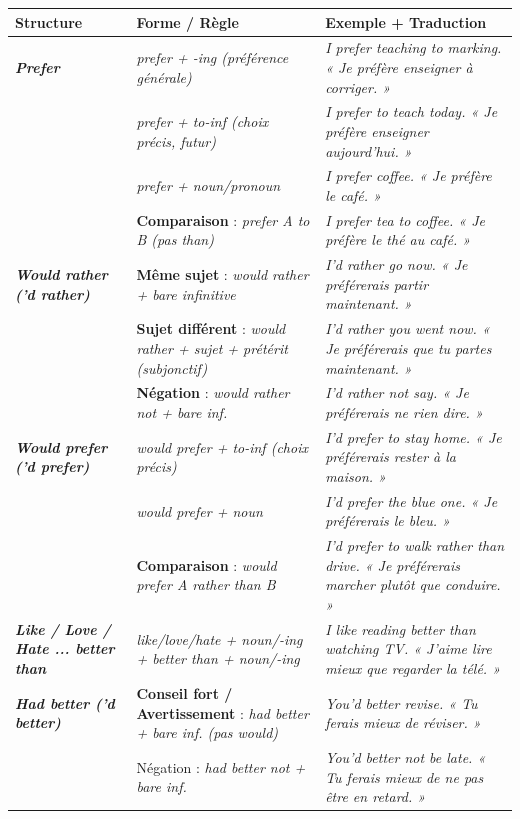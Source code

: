 \documentclass[11pt]{article}
\newcommand{\eng}[1]{\ifmmode\text{\textit{#1}}\else\begingroup\selectlanguage{english}\itshape #1\endgroup\fi}
\begin{document}
\begin{center}
\begin{tabularx}{\linewidth}{|>{\bfseries}l|X|X|}
\hline
\rowcolor{popblueL} \textbf{Structure} & \textbf{Forme / Règle} & \textbf{Exemple + Traduction} \\
\hline
\eng{Prefer} & \eng{prefer + -ing} (préférence générale) & \eng{I prefer teaching to marking.} « Je préfère enseigner à corriger. » \\
& \eng{prefer + to-inf} (choix précis, futur) & \eng{I prefer to teach today.} « Je préfère enseigner aujourd'hui. » \\
& \eng{prefer + noun/pronoun} & \eng{I prefer coffee.} « Je préfère le café. » \\
& \textbf{Comparaison} : \eng{prefer A to B} (pas \eng{than}) & \eng{I prefer tea to coffee.} « Je préfère le thé au café. » \\
\hline
\eng{Would rather} (\eng{'d rather}) & \textbf{Même sujet} : \eng{would rather + bare infinitive} & \eng{I'd rather go now.} « Je préférerais partir maintenant. » \\
& \textbf{Sujet différent} : \eng{would rather + sujet + prétérit (subjonctif)} & \eng{I'd rather you went now.} « Je préférerais que tu partes maintenant. » \\
& \textbf{Négation} : \eng{would rather not + bare inf.} & \eng{I'd rather not say.} « Je préférerais ne rien dire. » \\
\hline
\eng{Would prefer} (\eng{'d prefer}) & \eng{would prefer + to-inf} (choix précis) & \eng{I'd prefer to stay home.} « Je préférerais rester à la maison. » \\
& \eng{would prefer + noun} & \eng{I'd prefer the blue one.} « Je préférerais le bleu. » \\
& \textbf{Comparaison} : \eng{would prefer A rather than B} & \eng{I'd prefer to walk rather than drive.} « Je préférerais marcher plutôt que conduire. » \\
\hline
\eng{Like / Love / Hate ... better than} & \eng{like/love/hate + noun/-ing + better than + noun/-ing} & \eng{I like reading better than watching TV.} « J'aime lire mieux que regarder la télé. » \\
\hline
\eng{Had better} (\eng{'d better}) & \textbf{Conseil fort / Avertissement} : \eng{had better + bare inf.} (pas \eng{would}) & \eng{You'd better revise.} « Tu ferais mieux de réviser. » \\
& Négation : \eng{had better not + bare inf.} & \eng{You'd better not be late.} « Tu ferais mieux de ne pas être en retard. » \\
\hline
\end{tabularx}
\end{center}
\end{document}
